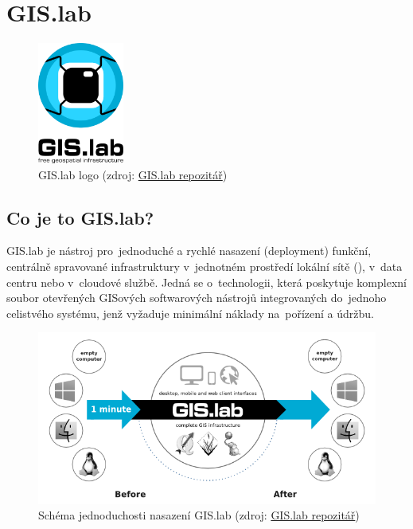 \chapter{GIS.lab}
\label{2-teorie}

\begin{figure}[H] \centering
    \includegraphics[width=80pt]{./pictures/gislab-logo.png}
    \caption[GIS.lab logo]{GIS.lab logo (zdroj:
	\href{https://github.com/gislab-npo/gislab-doc/blob/master/img/logo.svg}{GIS.lab repozitář})}
	\label{fig:gislab-logo}
\end{figure}

\section{Co je to GIS.lab?}
GIS.lab je nástroj pro~jednoduché a rychlé nasazení (deployment)
funkční, centrálně spravované  infrastruktury v~jednotném
prostředí lokální sítě (), v~data centru nebo v~cloudové
službě. Jedná se o~technologii, která poskytuje komplexní soubor
otevřených GISových softwarových nástrojů integrovaných do~jednoho
celistvého systému, jenž vyžaduje minimální náklady na~pořízení 
a údržbu. 

\begin{figure}[H] \centering
    \includegraphics[width=400pt]{./pictures/gislab-schema.png}
    \caption[Schéma jednoduchosti nasazení GIS.lab]{Schéma jednoduchosti nasazení GIS.lab (zdroj:
	\href{https://github.com/gislab-npo/gislab-doc/blob/master/img/general/gislab-schema.png}{GIS.lab repozitář})}
	\label{fig:gislab-schema}
\end{figure}

